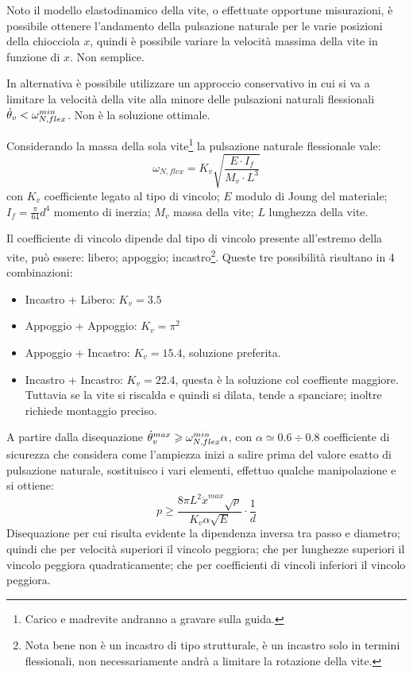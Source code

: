 Noto il modello elastodinamico della vite, o effettuate opportune misurazioni, è possibile ottenere l'andamento della pulsazione naturale per le varie posizioni della chiocciola \(x\), quindi è possibile variare la  velocità massima della vite in funzione di \(x\). Non semplice.

In alternativa è possibile utilizzare un approccio conservativo in cui si va a limitare la velocità della vite alla minore delle pulsazioni naturali flessionali \( \dot{\theta}_v < \omega_{N,flex}^{min} \). Non è la soluzione ottimale.

Considerando la massa della sola vite\footnote{Carico e madrevite andranno a gravare sulla guida.} la pulsazione naturale flessionale vale:
\[ \omega_{N,flex} = K_v \sqrt{\frac{E \cdot I_f}{M_v \cdot L^3}} \]
con \( K_v \) coefficiente legato al tipo di vincolo; \( E \) modulo di Joung del materiale; \( I_f = \frac{\pi}{64}d^4 \) momento di inerzia; \( M_v \) massa della vite; \( L \) lunghezza della vite.

Il coefficiente di vincolo dipende dal tipo di vincolo presente all'estremo della vite, può essere: libero; appoggio; incastro\footnote{Nota bene non è un incastro di tipo strutturale, è un incastro solo in termini flessionali, non necessariamente andrà a limitare la rotazione della vite.}.
Queste tre possibilità risultano in 4 combinazioni:
\begin{itemize}
    \item Incastro + Libero: \(K_v = 3.5\)
    \item Appoggio + Appoggio: \(K_v = \pi^2\)
    \item Appoggio + Incastro: \(K_v = 15.4\), soluzione preferita.
    \item Incastro + Incastro: \(K_v = 22.4\), questa è la soluzione col coeffiente maggiore. Tuttavia se la vite si riscalda e quindi si dilata, tende a spanciare; inoltre richiede montaggio preciso.
\end{itemize}

A partire dalla disequazione \( \dot{\theta}_v^{max} \geqslant \omega_{N,flex}^{min} \alpha \), con \( \alpha \simeq 0.6\div 0.8 \) coefficiente di sicurezza che considera come l'ampiezza inizi a salire prima del valore esatto di pulsazione naturale, sostituisco i vari elementi, effettuo qualche manipolazione e si ottiene:
\[ p \geqslant \frac{8\pi L^2 \dot{x}^{max} \sqrt{\rho}}{K_v \alpha \sqrt{E}} \cdot \frac{1}{d} \]
Disequazione per cui risulta evidente la dipendenza inversa tra passo e diametro; quindi che per velocità superiori il vincolo peggiora; che per lunghezze superiori il vincolo peggiora quadraticamente; che per coefficienti di vincoli inferiori il vincolo peggiora.

